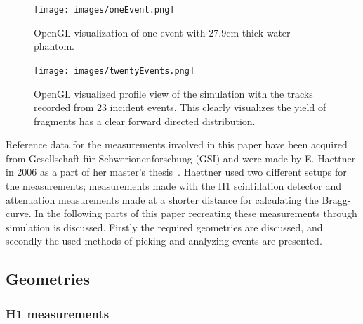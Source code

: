 \begin{figure}[h] 
\begin{center}
\texttt{[image: images/oneEvent.png]}  
\caption{\label{fig:oneEvent} OpenGL visualization of one event with 27.9cm thick water phantom.}
\end{center}
\end{figure}

\begin{figure}[h] 
\begin{center}
\texttt{[image: images/twentyEvents.png]}  
\caption{\label{fig:twentyEvents} OpenGL visualized profile view of the simulation with the tracks recorded from 23 incident events. This clearly visualizes the yield of fragments has a clear forward directed distribution.}
\end{center}
\end{figure}

Reference data for the measurements involved in this paper have been acquired from Gesellschaft für Schwerionenforschung (GSI) and were made by E. Haettner in 2006 as a part of her master's thesis~\cite{ehaettner}. Haettner used two different setups for the measurements; measurements made with the H1 scintillation detector and attenuation measurements made at a shorter distance for calculating the Bragg-curve. In the following parts of this paper recreating these measurements through simulation is discussed. Firstly the required geometries are discussed, and secondly the used methods of picking and analyzing events are presented.

\subsection{Geometries}

\subsubsection{H1 measurements}

